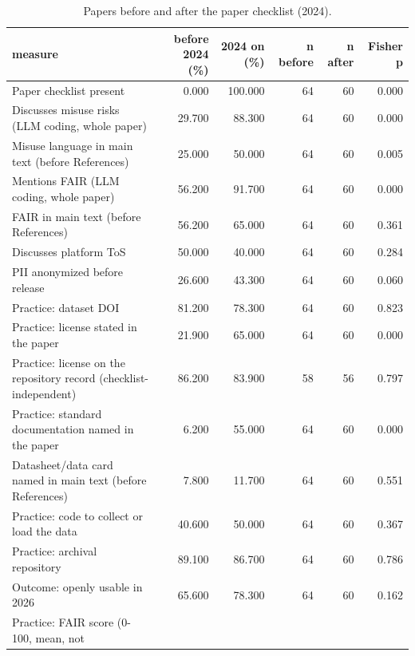 \begin{table}
\caption{Papers before and after the paper checklist (2024).}
\label{tab:policy}
\begin{tabular}{lrrrrr}
\toprule
measure & before 2024 (\%) & 2024 on (\%) & n before & n after & Fisher p \\
\midrule
Paper checklist present & 0.000 & 100.000 & 64 & 60 & 0.000 \\
Discusses misuse risks (LLM coding, whole paper) & 29.700 & 88.300 & 64 & 60 & 0.000 \\
Misuse language in main text (before References) & 25.000 & 50.000 & 64 & 60 & 0.005 \\
Mentions FAIR (LLM coding, whole paper) & 56.200 & 91.700 & 64 & 60 & 0.000 \\
FAIR in main text (before References) & 56.200 & 65.000 & 64 & 60 & 0.361 \\
Discusses platform ToS & 50.000 & 40.000 & 64 & 60 & 0.284 \\
PII anonymized before release & 26.600 & 43.300 & 64 & 60 & 0.060 \\
Practice: dataset DOI & 81.200 & 78.300 & 64 & 60 & 0.823 \\
Practice: license stated in the paper & 21.900 & 65.000 & 64 & 60 & 0.000 \\
Practice: license on the repository record (checklist-independent) & 86.200 & 83.900 & 58 & 56 & 0.797 \\
Practice: standard documentation named in the paper & 6.200 & 55.000 & 64 & 60 & 0.000 \\
Datasheet/data card named in main text (before References) & 7.800 & 11.700 & 64 & 60 & 0.551 \\
Practice: code to collect or load the data & 40.600 & 50.000 & 64 & 60 & 0.367 \\
Practice: archival repository & 89.100 & 86.700 & 64 & 60 & 0.786 \\
Outcome: openly usable in 2026 & 65.600 & 78.300 & 64 & 60 & 0.162 \\
Practice: FAIR score (0-100, mean, not %
\bottomrule
\end{tabular}
\end{table}
